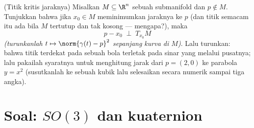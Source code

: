 \begin{exercise}[$\star\star$]\label{exo:b3:submanifolds:12}
(Titik kritis jaraknya) Misalkan $M \subseteq \R^n$ sebuah
submanifold dan $p \notin M$. Tunjukkan bahwa jika $x_0 \in M$
meminimumkan jaraknya ke $p$ (dan titik semacam itu ada bila $M$
tertutup dan tak kosong --- mengapa?), maka
\[
p - x_0 \;\perp\; T_{x_0}M
\]
\emph{(turunkanlah $t \mapsto \norm{\gamma(t) - p}^2$
sepanjang kurva di $M$)}. Lalu turunkan: bahwa titik terdekat pada
sebuah bola terletak pada sinar yang melalui pusatnya; lalu pakailah
syaratnya untuk menghitung jarak dari $p = (2, 0)$ ke
parabola $y = x^2$ (susutkanlah ke sebuah kubik lalu selesaikan
secara numerik sampai tiga angka).
\end{exercise}

\section{Soal: \texorpdfstring{$SO(3)$}{grup rotasi} dan
kuaternion}

